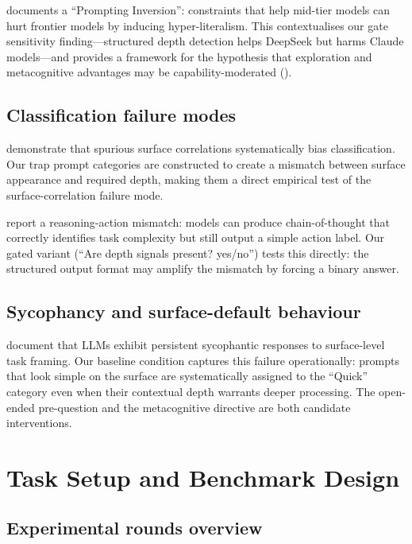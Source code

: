 \documentclass[11pt,a4paper]{article}
\begin{document}
\citet{Khan2025} documents a ``Prompting Inversion'': constraints that help
mid-tier models can hurt frontier models by inducing hyper-literalism.
This contextualises our gate sensitivity finding---structured depth
detection helps DeepSeek but harms Claude models---and provides a
framework for the hypothesis that exploration and metacognitive advantages
may be capability-moderated ().

\subsection{Classification failure modes}

\citet{Wu2024} demonstrate that spurious surface correlations systematically
bias classification.  Our trap prompt categories are constructed to create a
mismatch between surface appearance and required depth, making them a direct
empirical test of the surface-correlation failure mode.

\citet{MASFT2025} report a reasoning-action mismatch: models can produce
chain-of-thought that correctly identifies task complexity but still
output a simple action label.  Our gated variant (``Are depth signals
present? yes/no'') tests this directly: the structured output format may
amplify the mismatch by forcing a binary answer.

\subsection{Sycophancy and surface-default behaviour}

\citet{SycEval2025} document that LLMs exhibit persistent sycophantic
responses to surface-level task framing.  Our baseline condition captures
this failure operationally: prompts that look simple on the surface are
systematically assigned to the ``Quick'' category even when their contextual
depth warrants deeper processing.  The open-ended pre-question and the
metacognitive directive are both candidate interventions.

\section{Task Setup and Benchmark Design}
\label{sec:benchmark}

\subsection{Experimental rounds overview}
\end{document}
